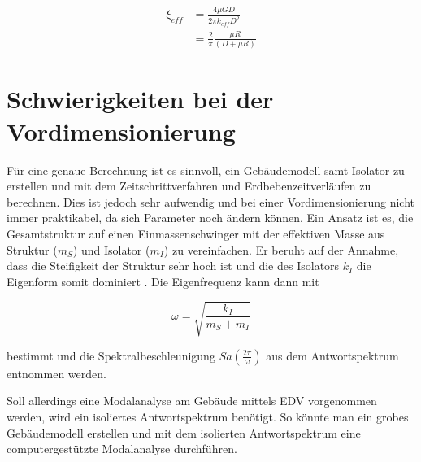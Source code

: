 \begin{align}
\xi_{eff} &= \frac{4 \mu G D}{2 \pi k_{eff} D^2}\nonumber\\
          &= \frac{2}{\pi} \frac{\mu R}{(D + \mu R)}\label{xieff}
\end{align}



\pagebreak

\section{Schwierigkeiten bei der Vordimensionierung}
\label{sec:schwierigkeitenvordimensionierung}

Für eine genaue Berechnung ist es sinnvoll, ein Gebäudemodell samt Isolator zu erstellen und mit dem Zeitschrittverfahren und Erdbebenzeitverläufen zu berechnen. Dies ist jedoch sehr aufwendig und bei einer Vordimensionierung nicht immer praktikabel, da sich Parameter noch ändern können.
Ein Ansatz ist es, die Gesamtstruktur auf einen Einmassenschwinger mit der effektiven Masse aus Struktur ($m_S$) und Isolator ($m_I$) zu vereinfachen. Er beruht auf der Annahme, dass die Steifigkeit der Struktur sehr hoch ist und die des Isolators $k_I$ die Eigenform somit dominiert \cite{Kelly2}.
Die Eigenfrequenz kann dann mit

\begin{equation}
\omega = \sqrt{\frac{k_I}{m_S + m_I}}
\end{equation}

bestimmt und die Spektralbeschleunigung $Sa(\frac{2 \pi}{\omega})$ aus dem Antwortspektrum entnommen werden.

Soll allerdings eine Modalanalyse am Gebäude mittels EDV vorgenommen werden, wird ein isoliertes Antwortspektrum benötigt.
So könnte man ein grobes Gebäudemodell erstellen und mit dem isolierten Antwortspektrum eine computergestützte Modalanalyse durchführen.

\pagebreak